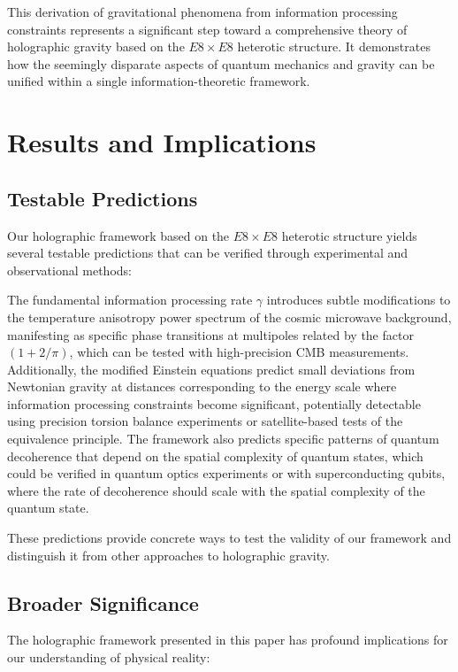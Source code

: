 \documentclass[11pt,english,twoside]{article}
\begin{document}
This derivation of gravitational phenomena from information processing constraints represents a significant step toward a comprehensive theory of holographic gravity based on the $E8\times E8$ heterotic structure. It demonstrates how the seemingly disparate aspects of quantum mechanics and gravity can be unified within a single information-theoretic framework.

\section{Results and Implications}

\subsection{Testable Predictions}

Our holographic framework based on the $E8\times E8$ heterotic structure yields several testable predictions that can be verified through experimental and observational methods:

The fundamental information processing rate $\gamma$ introduces subtle modifications to the temperature anisotropy power spectrum of the cosmic microwave background, manifesting as specific phase transitions at multipoles related by the factor $(1 + 2/\pi)$, which can be tested with high-precision CMB measurements. Additionally, the modified Einstein equations predict small deviations from Newtonian gravity at distances corresponding to the energy scale where information processing constraints become significant, potentially detectable using precision torsion balance experiments or satellite-based tests of the equivalence principle. The framework also predicts specific patterns of quantum decoherence that depend on the spatial complexity of quantum states, which could be verified in quantum optics experiments or with superconducting qubits, where the rate of decoherence should scale with the spatial complexity of the quantum state.

These predictions provide concrete ways to test the validity of our framework and distinguish it from other approaches to holographic gravity.

\subsection{Broader Significance}

The holographic framework presented in this paper has profound implications for our understanding of physical reality:
\end{document}
